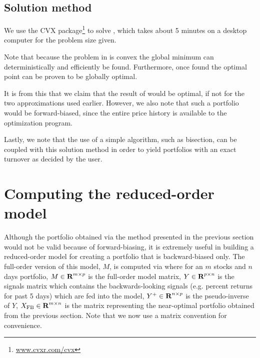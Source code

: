 \documentclass{article}
\begin{document}
\subsection{Solution method}
    We use the CVX package\footnote{\url{www.cvxr.com/cvx}} to solve 
        , which takes about 5 minutes on a desktop computer
        for the problem size given.

    Note that because the problem in  is convex
        the global minimum can deterministically and efficiently be found.
    Furthermore, once found the optimal point can be proven to be globally
        optimal.

    It is from this that we claim that the result of 
        would be optimal, if not for the two approximations used earlier.
    However, we also note that such a portfolio would be forward-biased,
        since the entire price history is available 
        to the optimization program.

    Lastly, we note that the use of a simple algorithm, such as bisection,
        can be coupled with this solution method
        in order to yield portfolios with an exact turnover 
        as decided by the user.

\section{Computing the reduced-order model}   

    Although the portfolio obtained 
        via the method presented in the previous section
        would not be valid because of forward-biasing,
        it is extremely useful in building a reduced-order model
        for creating a portfolio that is backward-biased only.
    The full-order version of this model, $M$, is computed via
    where for an $m$ stocks and $n$ days portfolio,
        \BI $M \in {\mbox{\bf R}}^{m \times p}$ is the full-order model matrix,
        \I  $Y \in {\mbox{\bf R}}^{p \times n}$ is the signals matrix 
            which contains the backwards-looking signals 
            (e.g. percent returns for past 5 days)
            which are fed into the model,
        \I  $Y^+ \in {\mbox{\bf R}}^{n \times p}$ is the pseudo-inverse of $Y$,
        \I  $X_\text{FB} \in {\mbox{\bf R}}^{m \times n}$ is the matrix representing 
            the near-optimal portfolio obtained from the previous section.
            Note that we now use a matrix convention for convenience. \EI
\end{document}
